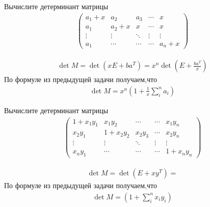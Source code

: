 \begin{prb}
    Вычислите детерминант матрицы
    \begin{gather*}
        \left(
        \begin{array}{ccccc}
           a_{1} + x &  a_{2} &  a_{3} & \cdots & x\\
           a_{1}  &  a_{2} + x & x & \cdots & x\\
           \vdots & \vdots & \ddots& \vdots & \vdots\\
           a_{1} & \cdots & \cdots & \cdots & a_{n} + x
        \end{array}
        \right)
    \end{gather*}
\end{prb}

\begin{sol}
    \begin{gather*}
        \det M =  \det (x E +  b a^{T}) = x^n \det\left(E +  \frac{ba^{T}}{x}\right)
    \end{gather*}
    По формуле из предыдущей задачи получаем,что
    \begin{gather*}
        \det M = x^n \left(1+ \frac{1}{x}\sum_{i}^{n} a_{i}\right)
    \end{gather*}

\end{sol}
    
    
\begin{prb}
    Вычислите детерминант матрицы
    \begin{gather*}
        \left(
        \begin{array}{ccccc}
            1 + x_{1} y_{1} &  x_{1} y_{2} & \cdots & \cdots &x_{1} y_{n}\\
           x_{2} y_{1}  &   1 + x_{2} y_2 & x_{2} y_{3} & \cdots & x_{2} y_{n}\\
           \vdots & \vdots & \ddots& \vdots & \vdots\\
           x_{n} y_{1} & \cdots & \cdots & \cdots & 1 + x_{n} y_{n}
        \end{array}
        \right)
    \end{gather*}
\end{prb}

\begin{sol}
    \begin{gather*}
        \det M =  \det (E +  x y^{T}) = 
    \end{gather*}
    По формуле из предыдущей задачи получаем,что
    \begin{gather*}
        \det M = \left(1+ \sum_{i}^{n} x_{i} y_{i}\right)
    \end{gather*}
\end{sol}    



